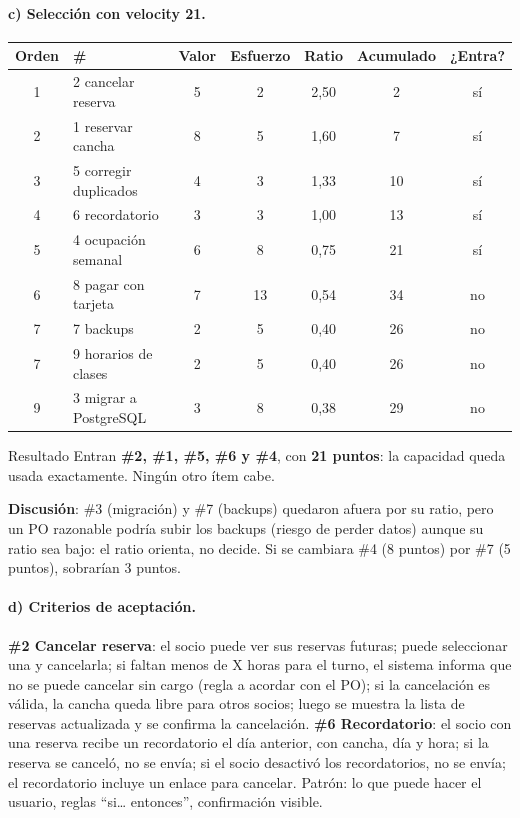 \documentclass[11pt,a4paper]{article}
\begin{document}
\paragraph{c) Selección con velocity 21.}
\begin{center}\small
\begin{tabular}{@{}c l c c c c c@{}}
\toprule
Orden & \# & Valor & Esfuerzo & Ratio & Acumulado & ¿Entra?\\
\midrule
1 & 2 cancelar reserva & 5 & 2 & 2,50 & 2 & sí\\
2 & 1 reservar cancha & 8 & 5 & 1,60 & 7 & sí\\
3 & 5 corregir duplicados & 4 & 3 & 1,33 & 10 & sí\\
4 & 6 recordatorio & 3 & 3 & 1,00 & 13 & sí\\
5 & 4 ocupación semanal & 6 & 8 & 0,75 & 21 & sí\\
6 & 8 pagar con tarjeta & 7 & 13 & 0,54 & 34 & no\\
7 & 7 backups & 2 & 5 & 0,40 & 26 & no\\
7 & 9 horarios de clases & 2 & 5 & 0,40 & 26 & no\\
9 & 3 migrar a PostgreSQL & 3 & 8 & 0,38 & 29 & no\\
\bottomrule
\end{tabular}
\end{center}
\begin{resultado}{Resultado}
Entran \textbf{\#2, \#1, \#5, \#6 y \#4}, con \textbf{21 puntos}: la capacidad queda usada exactamente. Ningún otro
ítem cabe.
\end{resultado}
\textbf{Discusión}: \#3 (migración) y \#7 (backups) quedaron afuera por su ratio, pero un PO razonable podría
subir los backups (riesgo de perder datos) aunque su ratio sea bajo: el ratio orienta, no decide. Si se cambiara
\#4 (8 puntos) por \#7 (5 puntos), sobrarían 3 puntos.

\paragraph{d) Criterios de aceptación.}
\textbf{\#2 Cancelar reserva}: el socio puede ver sus reservas futuras; puede seleccionar una y cancelarla; si
faltan menos de X horas para el turno, el sistema informa que no se puede cancelar sin cargo (regla a acordar con
el PO); si la cancelación es válida, la cancha queda libre para otros socios; luego se muestra la lista de
reservas actualizada y se confirma la cancelación.
\textbf{\#6 Recordatorio}: el socio con una reserva recibe un recordatorio el día anterior, con cancha, día y
hora; si la reserva se canceló, no se envía; si el socio desactivó los recordatorios, no se envía; el
recordatorio incluye un enlace para cancelar. Patrón: lo que puede hacer el usuario, reglas ``si\ldots
entonces'', confirmación visible.
\end{document}
